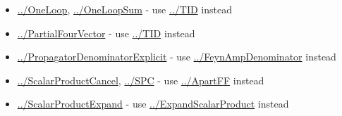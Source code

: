 \documentclass[../FeynCalcManual.tex]{subfiles}
\begin{document}
\begin{itemize}
\item
  \hyperlink{../oneloop}{../OneLoop},
  \hyperlink{../oneloopsum}{../OneLoopSum} - use
  \hyperlink{../tid}{../TID} instead
\item
  \hyperlink{../partialfourvector}{../PartialFourVector} - use
  \hyperlink{../tid}{../TID} instead
\item
  \hyperlink{../propagatordenominatorexplicit}{../PropagatorDenominatorExplicit}
  - use \hyperlink{../feynampdenominator}{../FeynAmpDenominator} instead
\item
  \hyperlink{../scalarproductcancel}{../ScalarProductCancel},
  \hyperlink{../spc}{../SPC} - use \hyperlink{../apartff}{../ApartFF}
  instead
\item
  \hyperlink{../scalarproductexpand}{../ScalarProductExpand} - use
  \hyperlink{../expandscalarproduct}{../ExpandScalarProduct} instead
\end{itemize}
\end{document}
